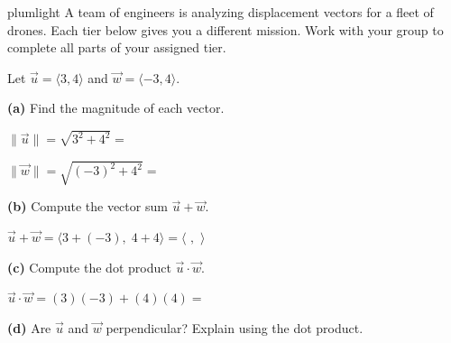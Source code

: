 \documentclass[10pt]{article}
\begin{document}
\namepartnerperiod

\vspace{0.1in}

\begin{scenariobox}{plumlight}
\small
A team of engineers is analyzing displacement vectors for a fleet of drones.
Each tier below gives you a different mission. Work with your group to complete
all parts of your assigned tier.
\end{scenariobox}

\vspace{0.1in}

\begin{tcolorbox}[colback=white, colframe=black!40,
    title=\textbf{Tier R --- Remediate},
    fonttitle=\bfseries, arc=2mm, left=3mm, right=3mm, top=2mm, bottom=2mm]
\small
Let $\vec{u} = \langle 3, 4\rangle$ and $\vec{w} = \langle -3, 4\rangle$.

\textbf{(a)} Find the magnitude of each vector.

\vspace{0.06in}
\hspace{1em} $\|\vec{u}\| = \sqrt{3^2 + 4^2} = $ 

\vspace{0.08in}
\hspace{1em} $\|\vec{w}\| = \sqrt{(-3)^2 + 4^2} = $ 

\vspace{0.14in}
\textbf{(b)} Compute the vector sum $\vec{u} + \vec{w}$.

\vspace{0.06in}
\hspace{1em} $\vec{u} + \vec{w} = \langle 3+(-3),\; 4+4 \rangle = \langle$ $,$ $\rangle$

\vspace{0.14in}
\textbf{(c)} Compute the dot product $\vec{u} \cdot \vec{w}$.

\vspace{0.06in}
\hspace{1em} $\vec{u} \cdot \vec{w} = (3)(-3) + (4)(4) = $ 

\vspace{0.14in}
\textbf{(d)} Are $\vec{u}$ and $\vec{w}$ perpendicular? Explain using the dot product.

\vspace{0.06in}
\end{tcolorbox}
\end{document}
